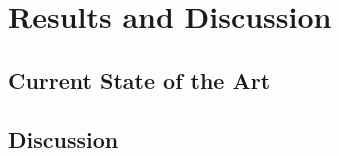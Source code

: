 \chapter{Results and Discussion}
\label{ch:results}


%
%
\section{Current State of the Art}
\label{sec:results:results}

%
%
\section{Discussion}
\label{sec:results:discussion}
